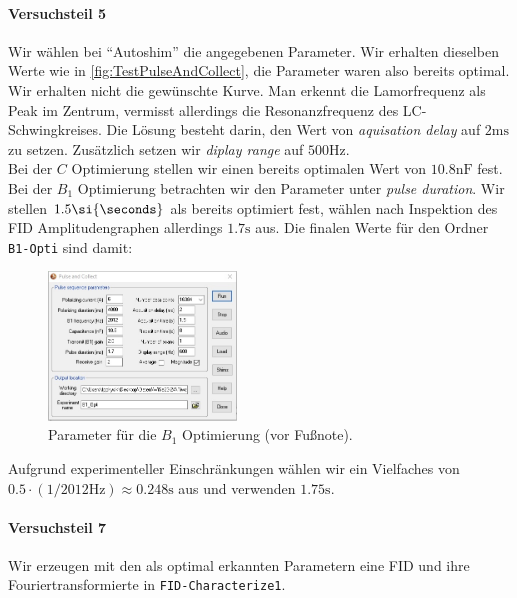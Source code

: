 \documentclass{subfiles}
\begin{document}
    
\paragraph*{Versuchsteil 5}
    Wir wählen bei \enquote{Autoshim} die angegebenen Parameter. Wir erhalten dieselben Werte wie in \ref{fig:TestPulseAndCollect}, die Parameter waren also bereits optimal. \\

    Wir erhalten nicht die gewünschte Kurve. Man erkennt die Lamorfrequenz als Peak im Zentrum, vermisst allerdings die Resonanzfrequenz des LC-Schwingkreises. Die Lösung besteht darin, den Wert von \emph{aquisation delay} auf $2\si{\ms}$ zu setzen. Zusätzlich setzen wir \emph{diplay range} auf $500\si{\hertz}$. \\

    Bei der $C$ Optimierung stellen wir einen bereits optimalen Wert von $10.8\si{\nano\farad}$ fest. \\

    Bei der $B_1$ Optimierung betrachten wir den Parameter unter \emph{pulse duration}. Wir stellen $1.5\si{\seconds}$ als bereits optimiert fest, wählen nach Inspektion des FID Amplitudengraphen allerdings $1.7\si{\s}$ aus. Die finalen Werte für den Ordner \texttt{B1-Opti} sind damit:
    \begin{figure}[H]
        \centering
        \includegraphics[width=5cm]{Live-Dokumente/Bilder/B1OptiWerte.jpeg}
        \caption{Parameter für die $B_1$ Optimierung (vor Fußnote).}
        \label{fig:B1OptiParam}
    \end{figure}
    Aufgrund experimenteller Einschränkungen wählen wir ein Vielfaches von $0.5\cdot (1/2012\si{\hertz})\approx 0.248\si{\s}$ aus und verwenden $1.75\si\s$.  


\paragraph*{Versuchsteil 7}
    Wir erzeugen mit den als optimal erkannten Parametern eine FID und ihre Fouriertransformierte in \texttt{FID-Characterize1}.
    
\end{document}

